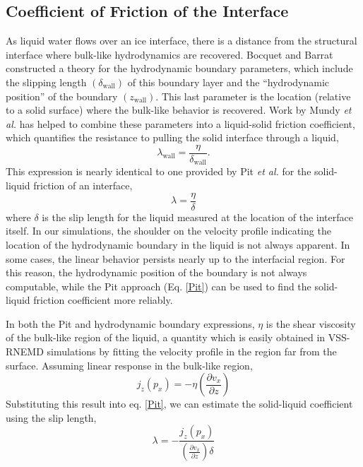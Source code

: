 \documentclass[11pt]{article}
\begin{document}
\begin{doublespace}
\subsection{Coefficient of Friction of the Interface}
As liquid water flows over an ice interface, there is a distance from
the structural interface where bulk-like hydrodynamics are recovered.
Bocquet and Barrat constructed a theory for the hydrodynamic boundary
parameters, which include the slipping length
$\left(\delta_\mathrm{wall}\right)$ of this boundary layer and the
``hydrodynamic position'' of the boundary
$\left(z_\mathrm{wall}\right)$.\cite{PhysRevLett.70.2726,PhysRevE.49.3079}
This last parameter is the location (relative to a solid surface)
where the bulk-like behavior is recovered.  Work by Mundy {\it et al.}
has helped to combine these parameters into a liquid-solid friction
coefficient, which quantifies the resistance to pulling the solid
interface through a liquid,\cite{Mundy1997305}
\begin{equation}
\lambda_\mathrm{wall} = \frac{\eta}{\delta_\mathrm{wall}}.
\end{equation}
This expression is nearly identical to one provided by Pit {\it et
  al.} for the solid-liquid friction of an interface,\cite{Pit99}
\begin{equation}\label{Pit}
  \lambda=\frac{\eta}{\delta}
\end{equation}
where $\delta$ is the slip length for the liquid measured at the
location of the interface itself.  In our simulations, the shoulder on
the velocity profile indicating the location of the hydrodynamic
boundary in the liquid is not always apparent. In some cases, the
linear behavior persists nearly up to the interfacial region.  For
this reason, the hydrodynamic position of the boundary is not always
computable, while the Pit approach (Eq. \ref{Pit}) can be used to find
the solid-liquid friction coefficient more reliably.

In both the Pit and hydrodynamic boundary expressions, $\eta$ is the
shear viscosity of the bulk-like region of the liquid, a quantity
which is easily obtained in VSS-RNEMD simulations by fitting the
velocity profile in the region far from the surface.\cite{Kuang12}
Assuming linear response in the bulk-like region,
\begin{equation}\label{Kuang}
j_{z}(p_{x})=-\eta \left(\frac{\partial v_{x}}{\partial z}\right)
\end{equation}
Substituting this result into eq. \eqref{Pit}, we can estimate the
solid-liquid coefficient using the slip length,
\begin{equation}
\lambda=-\frac{j_{z}(p_{x})} {\left(\frac{\partial v_{x}}{\partial
      z}\right) \delta}
\end{equation}


\end{doublespace}
\end{document}
